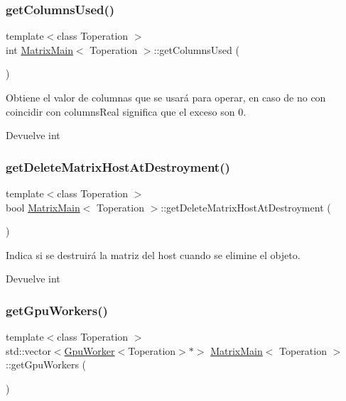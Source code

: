 \subsubsection{\texorpdfstring{get\+Columns\+Used()}{getColumnsUsed()}}
{\footnotesize\ttfamily template$<$class Toperation $>$ \\
int \hyperlink{classMatrixMain}{Matrix\+Main}$<$ Toperation $>$\+::get\+Columns\+Used (\begin{DoxyParamCaption}{ }\end{DoxyParamCaption})}



Obtiene el valor de columnas que se usará para operar, en caso de no con coincidir con columns\+Real significa que el exceso son 0. 

\begin{DoxyReturn}{Devuelve}
int 
\end{DoxyReturn}
\mbox{\label{classMatrixMain_ada6337937413c1ad5660373ab23b1b40}} 
\subsubsection{\texorpdfstring{get\+Delete\+Matrix\+Host\+At\+Destroyment()}{getDeleteMatrixHostAtDestroyment()}}
{\footnotesize\ttfamily template$<$class Toperation $>$ \\
bool \hyperlink{classMatrixMain}{Matrix\+Main}$<$ Toperation $>$\+::get\+Delete\+Matrix\+Host\+At\+Destroyment (\begin{DoxyParamCaption}{ }\end{DoxyParamCaption})}



Indica si se destruirá la matriz del host cuando se elimine el objeto. 

\begin{DoxyReturn}{Devuelve}
int 
\end{DoxyReturn}
\mbox{\label{classMatrixMain_a627cb55a45b1a2618387483d24878d63}} 
\subsubsection{\texorpdfstring{get\+Gpu\+Workers()}{getGpuWorkers()}}
{\footnotesize\ttfamily template$<$class Toperation $>$ \\
std\+::vector$<$\hyperlink{classGpuWorker}{Gpu\+Worker}$<$Toperation$>$$\ast$$>$ \hyperlink{classMatrixMain}{Matrix\+Main}$<$ Toperation $>$\+::get\+Gpu\+Workers (\begin{DoxyParamCaption}{ }\end{DoxyParamCaption})}



